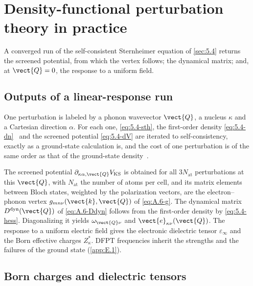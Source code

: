 \section{Density-functional perturbation theory in practice}\label{app:E.4}

A converged run of the self-consistent Sternheimer equation of \cref{sec:5.4} returns the screened potential, from which the vertex follows; the dynamical matrix; and, at $\vect{Q} = 0$, the response to a uniform field.

\subsection{Outputs of a linear-response run}

One perturbation is labeled by a phonon wavevector $\vect{Q}$, a nucleus $\kappa$ and a Cartesian direction $\alpha$. For each one, \cref{eq:5.4-sth}, the first-order density \cref{eq:5.4-dn}~\cite[Eq.~(49)]{giustino2017electron} and the screened potential \cref{eq:5.4-dV} are iterated to self-consistency, exactly as a ground-state calculation is, and the cost of one perturbation is of the same order as that of the ground-state density~\cite[Sect.~II.C]{baroni2001phonons}.

The screened potential $\partial_{\kappa\alpha,\vect{Q}}V_{\mathrm{KS}}$ is obtained for all $3N_{\mathrm{at}}$ perturbations at this $\vect{Q}$, with $N_{\mathrm{at}}$ the number of atoms per cell, and its matrix elements between Bloch states, weighted by the polarization vectors, are the electron--phonon vertex $g_{mn\nu}(\vect{k},\vect{Q})$ of \cref{eq:A.6-g}. The dynamical matrix $D^{\mathrm{dyn}}(\vect{Q})$ of \cref{eq:A.6-Ddyn} follows from the first-order density by \cref{eq:5.4-hess}. Diagonalizing it yields $\omega_{\vect{Q}\nu}$ and $\vect{e}_{\kappa\nu}(\vect{Q})$. The response to a uniform electric field gives the electronic dielectric tensor $\varepsilon_\infty$ and the Born effective charges $Z^*_\kappa$. DFPT frequencies inherit the strengths and the failures of the ground state (\cref{app:E.1}).

\subsection{Born charges and dielectric tensors}

